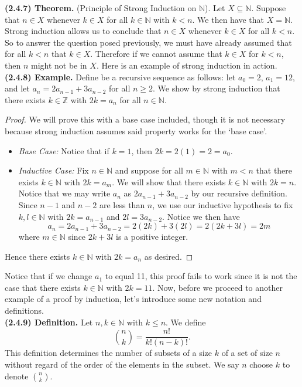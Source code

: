 \documentclass[12pt]{book}
\def\N{{\mathbb{N}}}
\def\Z{{\mathbb{Z}}}
\def\header #1{\noindent\textbf{#1}}
\begin{document}
\header{(2.4.7) Theorem.} (Principle of Strong Induction on $\N$). Let $X\subseteq\N$. Suppose that $n\in X$ whenever $k\in X$ for all $k\in\N$ with $k<n$. We then have that $X=\N$.\\

Strong induction allows us to conclude that $n\in X$ whenever $k\in X$ for all $k<n$. So to answer the question posed previously, we must have already assumed that for all $k<n$ that $k\in X$. Therefore if we cannot assume that $k\in X$ for $k<n$, then $n$ might not be in $X$. Here is an example of strong induction in action.\\

\header{(2.4.8) Example.} Define be a recursive sequence as follows: let $a_0=2$, $a_1=12$, and let $a_{n}=2a_{n-1}+3a_{n-2}$ for all $n\geq 2$. We show by strong induction that there exists $k\in\Z$ with $2k=a_n$ for all $n\in\N$.
\begin{proof}
We will prove this with a base case included, though it is not necessary because strong induction assumes said property works for the `base case'.
\begin{itemize}
\item\textit{Base Case:} Notice that if $k=1$, then $2k=2(1)=2=a_0$.
\item\textit{Inductive Case:} Fix $n\in\N$ and suppose for all $m\in\N$ with $m<n$ that there exists $k\in\N$ with $2k=a_m$. We will show that there exists $k\in\N$ with $2k=n$. Notice that we may write $a_n$ as $2a_{n-1}+3a_{n-2}$ by our recursive definition. Since $n-1$ and $n-2$ are less than $n$, we use our inductive hypothesis to fix $k,l\in\N$ with $2k=a_{n-1}$ and $2l=3a_{n-2}$. Notice we then have
\[a_n=2a_{n-1}+3a_{n-2}=2(2k)+3(2l)=2(2k+3l)=2m\]
where $m\in\N$ since $2k+3l$ is a positive integer.
\end{itemize}
Hence there exists $k\in\N$ with $2k=a_n$ as desired.
\end{proof} 

Notice that if we change $a_1$ to equal 11, this proof fails to work since it is not the case that there exists $k\in\N$ with $2k=11$. Now, before we proceed to another example of a proof by induction, let's introduce some new notation and definitions.\\

\header{(2.4.9) Definition.} Let $n,k\in\N$ with $k\leq n$. We define
\[\binom{n}{k}=\frac{n!}{k!(n-k)!}.\]
This definition determines the number of subsets of a size $k$ of a set of size $n$ without regard of the order of the elements in the subset. We say $n$ choose $k$ to denote $\binom{n}{k}$.\\
\end{document}
